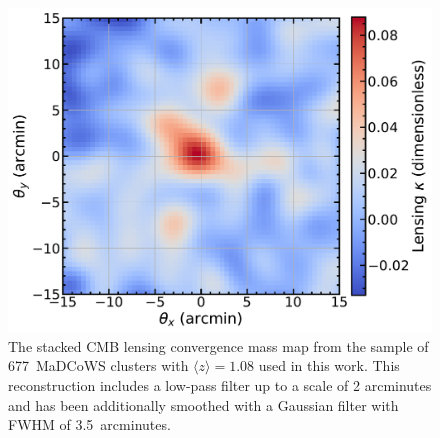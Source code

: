 \documentclass[preprint2]{aastex63}
\newcommand{\meanz}{1.08}
\newcommand{\nclusters}{677~}
\begin{document}
\begin{figure}[t]
    \centering
    \includegraphics[width=0.95\columnwidth]{fig2.pdf}
    \caption{The stacked CMB lensing convergence mass map from the sample of \nclusters MaDCoWS clusters with $\langle z\rangle=\meanz$ used in this work. This reconstruction includes a low-pass filter up to a scale of 2 arcminutes and has been additionally smoothed with a Gaussian filter with FWHM of 3.5~arcminutes. }
    \label{fig:stamp}
\end{figure}
\end{document}
